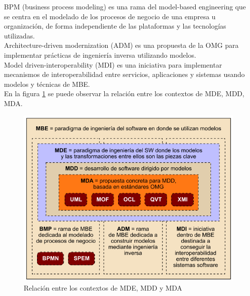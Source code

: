BPM (business process modeling) es una rama del model-based engineering que se centra en el modelado de los procesos de negocio de una empresa u organización, de forma independiente de las plataformas y las tecnologías utilizadas.\\

Architecture-driven modernization (ADM) es una propuesta de la OMG para implementar prácticas de ingeniería inversa utilizando modelos.\\

Model driven-interoperability (MDI) es una iniciativa para implementar mecanismos de interoperabilidad entre servicios, aplicaciones y sistemas usando modelos y técnicas de MBE.\\

En la figura \ref{fig:Relacíon entre los contextos de MDE, MDD y MDA} se puede observar la relación entre los contextos de MDE, MDD, MDA.

\begin{figure}[!h] 
	\begin{center}
		\includegraphics [scale=0.50]{imagenes/Relacion_MDE_MDD_MDA.png}
	\end{center}
	\caption{Relación entre los contextos de MDE, MDD y MDA}
	\label{fig:Relacíon entre los contextos de MDE, MDD y MDA}
\end{figure} 

